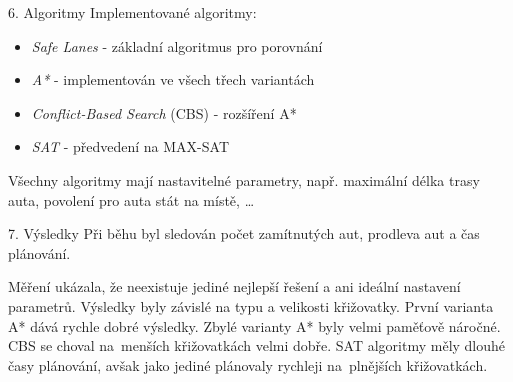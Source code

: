 \documentclass[portrait,fontscale=0.26,paperwidth=842mm,paperheight=1185mm]{baposter.cls}
\begin{document}
\begin{poster}
\begin{posterbox}[column=1, name=algoritmy, below=ukazka]{6. Algoritmy}
			Implementované algoritmy:
			\begin{itemize}
				\item \textit{Safe Lanes} - základní algoritmus pro porovnání
				\item \textit{A*} - implementován ve všech třech variantách
				\item \textit{Conflict-Based Search} (CBS) - rozšíření A*
				\item \textit{SAT} - předvedení na MAX-SAT
			\end{itemize}

			Všechny algoritmy mají nastavitelné parametry, např.
			maximální délka trasy auta, povolení pro auta stát na místě, \dots
		\end{posterbox}

		\begin{posterbox}[column=1, name=vysledky, below=algoritmy, headerColorOne=purple!24, boxColorOne=purple!8]{7. Výsledky}
			Při běhu byl sledován počet zamítnutých aut, prodleva aut a čas plánování.

			Měření ukázala, že neexistuje jediné nejlepší řešení a ani ideální nastavení parametrů.
			Výsledky byly závislé na typu a velikosti křižovatky.
			První varianta A* dává rychle dobré výsledky.
			Zbylé varianty A* byly velmi paměťově náročné.
			CBS se choval na~menších křižovatkách velmi dobře.
			SAT algoritmy měly dlouhé časy plánování,
			avšak jako jediné plánovaly rychleji na~plnějších křižovatkách.
		\end{posterbox}
	\end{poster}
\end{document}
